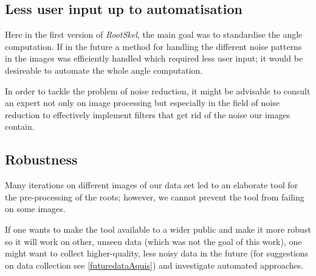 \subsection{Less user input up to automatisation}

Here in the first version of \textit{RootSkel}, the main goal was to standardise the angle computation. If in the future  a method for handling the different noise patterns in the images was efficiently handled which required less user input; it would be desireable to automate the whole angle computation.

In order to tackle the problem of noise reduction, it might be advisable to consult an expert not only on image processing but especially in the field of noise reduction to effectively implement filters that get rid of the noise our images contain. 

 

\subsection{Robustness}



Many iterations on different images of our data set led to an elaborate tool for the pre-processing of the roots; however, we cannot prevent the tool from failing on some images. 

If one wants to make the tool available to a wider public and make it more robust so it will work on other, unseen data (which was not the goal of this work), one might want to collect higher-quality, less noisy data in the future (for suggestions on data collection see \ref{futuredataAquis}) and investigate automated approaches. %




